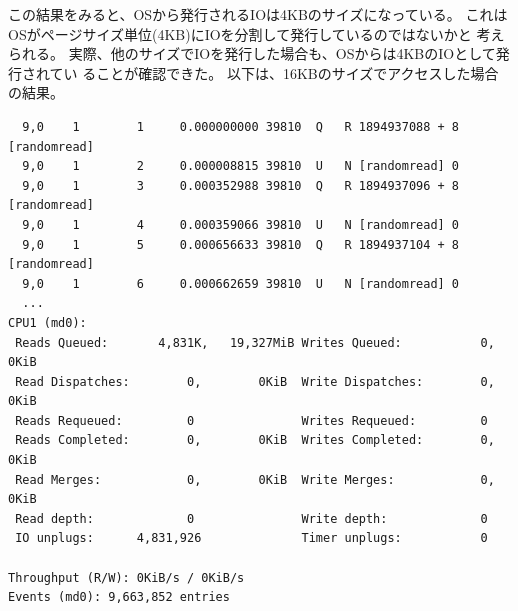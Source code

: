 \documentclass[11pt,a4paper]{jsarticle}
\begin{document}
この結果をみると、OSから発行されるIOは4KBのサイズになっている。
これはOSがページサイズ単位(4KB)にIOを分割して発行しているのではないかと
考えられる。
実際、他のサイズでIOを発行した場合も、OSからは4KBのIOとして発行されてい
ることが確認できた。
以下は、16KBのサイズでアクセスした場合の結果。
\begin{verbatim}
  9,0    1        1     0.000000000 39810  Q   R 1894937088 + 8 [randomread]
  9,0    1        2     0.000008815 39810  U   N [randomread] 0
  9,0    1        3     0.000352988 39810  Q   R 1894937096 + 8 [randomread]
  9,0    1        4     0.000359066 39810  U   N [randomread] 0
  9,0    1        5     0.000656633 39810  Q   R 1894937104 + 8 [randomread]
  9,0    1        6     0.000662659 39810  U   N [randomread] 0
  ...
CPU1 (md0):
 Reads Queued:       4,831K,   19,327MiB Writes Queued:           0,        0KiB
 Read Dispatches:        0,        0KiB  Write Dispatches:        0,        0KiB
 Reads Requeued:         0               Writes Requeued:         0
 Reads Completed:        0,        0KiB  Writes Completed:        0,        0KiB
 Read Merges:            0,        0KiB  Write Merges:            0,        0KiB
 Read depth:             0               Write depth:             0
 IO unplugs:      4,831,926              Timer unplugs:           0

Throughput (R/W): 0KiB/s / 0KiB/s
Events (md0): 9,663,852 entries
\end{verbatim}
\end{document}
